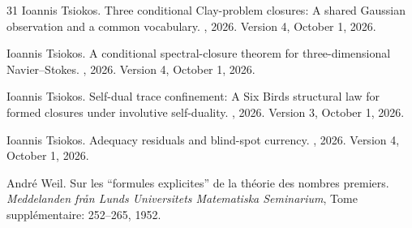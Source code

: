 \documentclass[11pt]{article}
\theoremstyle{definition}
\begin{document}
\begin{thebibliography}{31}
Ioannis Tsiokos.
\newblock Three conditional {Clay}-problem closures: A shared {Gaussian} observation and a common vocabulary.
\newblock {}, 2026{}.
\newblock Version 4, October 1, 2026.

Ioannis Tsiokos.
\newblock A conditional spectral-closure theorem for three-dimensional {Navier--Stokes}.
\newblock {}, 2026{}.
\newblock Version 4, October 1, 2026.

Ioannis Tsiokos.
\newblock Self-dual trace confinement: A {Six Birds} structural law for formed closures under involutive self-duality.
\newblock {}, 2026{}.
\newblock Version 3, October 1, 2026.

Ioannis Tsiokos.
\newblock Adequacy residuals and blind-spot currency.
\newblock {}, 2026{}.
\newblock Version 4, October 1, 2026.

Andr{\'e} Weil.
\newblock Sur les ``formules explicites'' de la th{\'e}orie des nombres premiers.
\newblock \emph{Meddelanden fr{\aa}n Lunds Universitets Matematiska Seminarium}, Tome suppl{\'e}mentaire: 252--265, 1952.

\end{thebibliography}
\end{document}
